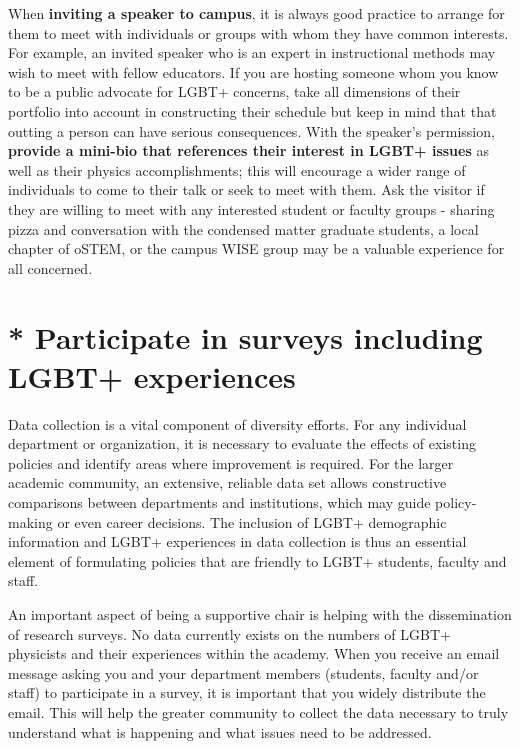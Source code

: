 When \textbf{inviting a speaker to campus}, it is always good practice to arrange for them to meet with individuals or groups with whom they have common interests. For example, an invited speaker who is an expert in instructional methods may wish to meet with fellow educators. If you are hosting someone whom you know to be a public advocate for LGBT+ concerns, take all dimensions of their portfolio into account in constructing their schedule but keep in mind that that outting a person can have serious consequences. With the speaker's permission, \textbf{provide a mini-bio that references their interest in LGBT+ issues} as well as their physics accomplishments; this will encourage a wider range of individuals to come to their talk or seek to meet with them. Ask the visitor if they are willing to meet with any interested student or faculty groups - sharing pizza and conversation with the condensed matter graduate students, a local chapter of oSTEM, or the campus WISE group may be a valuable experience for all concerned.


\section {* Participate in surveys including LGBT+ experiences}
\label{surveys}
Data collection is a vital component of diversity efforts. For any individual department or organization, it is necessary to evaluate the effects of existing policies and identify areas where improvement is required. For the larger academic community, an extensive, reliable data set allows constructive comparisons between departments and institutions, which may guide policy-making or even career decisions. The inclusion of LGBT+ demographic information and LGBT+ experiences in data collection is thus an essential element of formulating policies that are friendly to LGBT+ students, faculty and staff.

An important aspect of being a supportive chair is helping with the dissemination of research surveys. No data currently exists on the numbers of LGBT+ physicists and their experiences within the academy. When you receive an email message asking you and your department members (students, faculty and/or staff) to participate in a survey, it is important that you widely distribute the email. This will help the greater community to collect the data necessary to truly understand what is happening and what issues need to be addressed.

